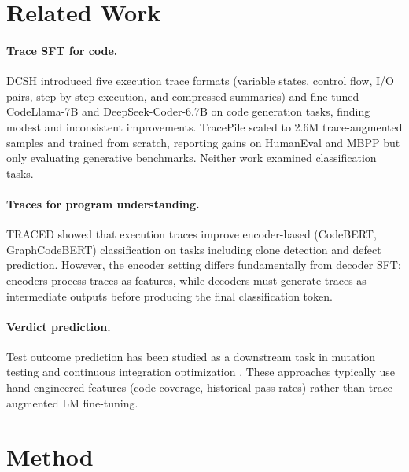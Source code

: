 \documentclass[11pt,a4paper]{article}
\begin{document}
\section{Related Work}
\label{sec:related}

\paragraph{Trace SFT for code.} DCSH \cite{dcsh2025} introduced five execution trace formats (variable states, control flow, I/O pairs, step-by-step execution, and compressed summaries) and fine-tuned CodeLlama-7B and DeepSeek-Coder-6.7B on code generation tasks, finding modest and inconsistent improvements. TracePile \cite{tracepile2025} scaled to 2.6M trace-augmented samples and trained from scratch, reporting gains on HumanEval and MBPP but only evaluating generative benchmarks. Neither work examined classification tasks.

\paragraph{Traces for program understanding.} TRACED \cite{traced2024} showed that execution traces improve encoder-based (CodeBERT, GraphCodeBERT) classification on tasks including clone detection and defect prediction. However, the encoder setting differs fundamentally from decoder SFT: encoders process traces as features, while decoders must generate traces as intermediate outputs before producing the final classification token.

\paragraph{Verdict prediction.} Test outcome prediction has been studied as a downstream task in mutation testing and continuous integration optimization \cite{muttest2023,ciopt2024}. These approaches typically use hand-engineered features (code coverage, historical pass rates) rather than trace-augmented LM fine-tuning.

\section{Method}
\label{sec:method}
\end{document}
